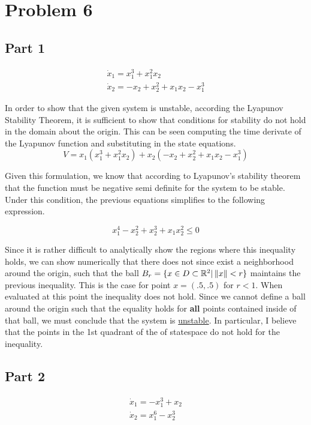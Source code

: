 \section*{Problem 6}

\subsection*{Part 1}
$$
\begin{array}{l}
\dot{x}_{1}=x_{1}^{3}+x_{1}^{2} x_{2} \\
\dot{x}_{2}=-x_{2}+x_{2}^{2}+x_{1} x_{2}-x_{1}^{3}
\end{array}
$$

\noindent In order to show that the given system is unstable, according the Lyapunov Stability Theorem, it is sufficient to show that conditions for stability do not hold in the domain about the origin. This can be seen computing the time derivate of the Lyapunov function and substituting in the state equations.
$$
V=x_{1}\left(x_{1}^{3}+x_{1}^{2} x_{2}\right)+x_{2}\left(-x_{2}+x_{2}^{2}+x_{1} x_{2}-x_{1}^{3}\right)
$$

\noindent Given this formulation, we know that according to Lyapunov's stability theorem that the function must be negative semi definite for the system to be stable. Under this condition, the previous equations simplifies to the following expression.

$$
x_{1}^{4}-x_{2}^{2}+x_{2}^{3}+x_{1} x_{2}^{2} \leq 0
$$

\noindent Since it is rather difficult to analytically show the regions where this inequality holds, we can show numerically that there does not since exist a neighborhood around the origin, such that the ball $B_r = \{ x \in D \subset \mathbb{R}^2 | \left\Vert x \right\Vert < r \}$ maintains the previous inequality. This is the case for point $x = (.5, .5)$ for $r <1$. When evaluated at this point the inequality does not hold. Since we cannot define a ball around the origin such that the equality holds for \textbf{all} points contained inside of that ball, we must conclude that the system is \underline{unstable}.  In particular, I believe that the points in the 1st quadrant of the of statespace do not hold for the inequality.

\subsection*{Part 2}


$$
\begin{array}{l}
\dot{x}_{1}=-x_{1}^{3}+x_{2} \\
\dot{x}_{2}=x_{1}^{6}-x_{2}^{3}
\end{array}
$$


